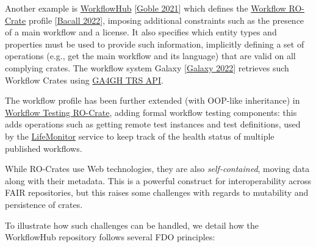Another example is \href{https://workflowhub.eu/}{WorkflowHub}
{[}\href{https://doi.org/10.5281/zenodo.4605654}{Goble 2021}{]} which
defines the
\href{https://w3id.org/workflowhub/workflow-ro-crate/1.0}{Workflow
RO-Crate} profile
{[}\href{https://w3id.org/workflowhub/workflow-ro-crate/1.0}{Bacall
2022}{]}, imposing additional constraints such as the presence of a main
workflow and a license. It also specifies which entity types and
properties must be used to provide such information, implicitly defining
a set of operations (e.g., get the main workflow and its language) that
are valid on all complying crates. The workflow system Galaxy
{[}\href{https://doi.org/10.1093/nar/gkac247}{Galaxy 2022}{]} retrieves
such Workflow Crates using
\href{https://about.workflowhub.eu/developer/trs/}{GA4GH TRS API}.

The workflow profile has been further extended (with OOP-like
inheritance) in
\href{https://crs4.github.io/life_monitor/workflow_testing_ro_crate}{Workflow
Testing RO-Crate}, adding formal workflow testing components: this adds
operations such as getting remote test instances and test definitions,
used by the \href{https://www.lifemonitor.eu/}{LifeMonitor} service to
keep track of the health status of multiple published workflows.

While RO-Crates use Web technologies, they are also
\emph{self-contained}, moving data along with their metadata. This is a
powerful construct for interoperability across FAIR repositories, but
this raises some challenges with regards to mutability and persistence
of crates.

To illustrate how such challenges can be handled, we detail how the
WorkflowHub repository follows several FDO principles:

